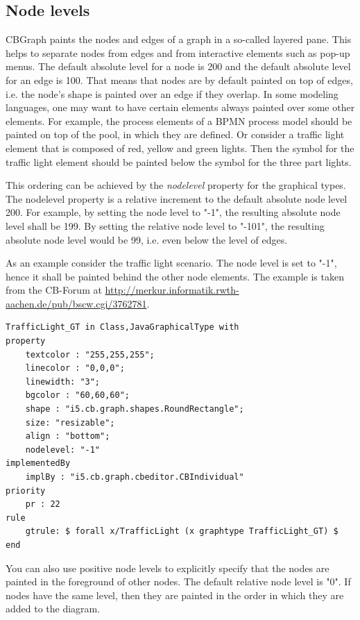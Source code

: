 \vspace{0.7cm}


\subsection{Node levels}
\label{sec:nodelevel}

CBGraph paints the nodes and edges of a graph in a so-called layered pane. This helps
to separate nodes from edges and from interactive elements such as pop-up menus.
The default absolute level for a node is 200 and the default absolute level for an edge is
100. That means that nodes are by default painted on top of edges, i.e. the node's shape
is painted over an edge if they overlap. In some modeling languages, one may want to
have certain elements always painted over some other elements. For example, the process
elements of a BPMN process model should be painted on top of the pool, in which they are defined.
Or consider a traffic light element that is composed of red, yellow and green lights. Then the symbol
for the traffic light element should be painted below the symbol for the three part lights.

This ordering can be achieved by the {\em nodelevel\/} property for the graphical types. The nodelevel
property is a relative increment to the default absolute node level 200. For example, by setting
the node level to "-1", the resulting absolute node level shall be 199. By setting the relative
node level to "-101", the resulting absolute node level would be 99, i.e. even below the level of edges. 

As an example consider the traffic light scenario. The node level is set to "-1", hence it shall
be painted behind the other node elements. The example is taken from the CB-Forum at
\url{http://merkur.informatik.rwth-aachen.de/pub/bscw.cgi/3762781}.


{\small
\begin{verbatim}
TrafficLight_GT in Class,JavaGraphicalType with
property
    textcolor : "255,255,255";
    linecolor : "0,0,0";
    linewidth: "3";
    bgcolor : "60,60,60";
    shape : "i5.cb.graph.shapes.RoundRectangle";
    size: "resizable";
    align : "bottom";
    nodelevel: "-1"
implementedBy
    implBy : "i5.cb.graph.cbeditor.CBIndividual"
priority
    pr : 22
rule
    gtrule: $ forall x/TrafficLight (x graphtype TrafficLight_GT) $
end
\end{verbatim}
}

You can also use positive node levels to explicitly specify that the nodes are painted 
in the foreground of other nodes. The default relative node level is "0". 
If nodes have the same level, then they are painted in the order in which they are added
to the diagram.

